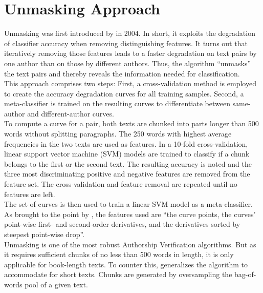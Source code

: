 \section{Unmasking Approach}\label{sec:unmasking-approach}
Unmasking was first introduced by \citeauthor{koppel2004unmasking} in 2004.
In short, it exploits the degradation of classifier accuracy when removing distinguishing features.
It turns out that iteratively removing those features leads to a faster degradation on text pairs by one author than on those by different authors.
Thus, the algorithm ``unmasks'' the text pairs and thereby reveals the information needed for classification.\\
This approach comprises two steps: First, a cross-validation method is employed to create the accuracy degradation curves for all training samples.
Second, a meta-classifier is trained on the resulting curves to differentiate between same-author and different-author curves.\\
To compute a curve for a pair, both texts are chunked into parts longer than 500 words without splitting paragraphs.
The 250 words with highest average frequencies in the two texts are used as features.
In a 10-fold cross-validation, linear support vector machine (SVM) models are trained to classify if a chunk belongs to the first or the second text.
The resulting accuracy is noted and the three most discriminating positive and negative features are removed from the feature set.
The cross-validation and feature removal are repeated until no features are left.\\
The set of curves is then used to train a linear SVM model as a meta-classifier.
As brought to the point by \cite{bevendorff2019unmaskingShortTexts}, the features used are ``the curve points, the curves' point-wise first- and second-order derivatives, and the derivatives sorted by steepest point-wise drop''.\\
Unmasking is one of the most robust Authorship Verification algorithms.
But as it requires sufficient chunks of no less than 500 words in length, it is only applicable for book-length texts.
To counter this, \cite{bevendorff2019unmaskingShortTexts} generalizes the algorithm to accommodate for short texts.
Chunks are generated by oversampling the bag-of-words pool of a given text.
